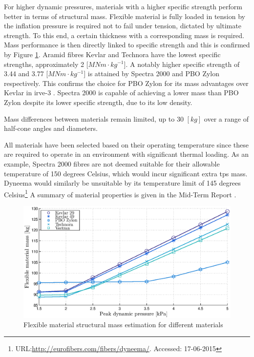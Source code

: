 For higher dynamic pressures, materials with a higher specific strength perform better in terms of structural mass. Flexible material is fully loaded in tension by the inflation pressure is required not to fail under tension, dictated by ultimate strength. To this end, a certain thickness with a corresponding mass is required. Mass performance is then directly linked to specific strength and this is confirmed by Figure \ref{fig:mat}. Aramid fibres Kevlar and Technora have the lowest specific strengths, approximately 2 [$MNm \cdot kg^{-1}$]. A notably higher specific strength of 3.44 and 3.77 [$MNm \cdot kg^{-1}$] is attained by Spectra 2000 and PBO Zylon respectively. This confirms the choice for PBO Zylon for its mass advantages over Kevlar in \gls{irve}-3 \cite{Dillman2012a}. Spectra 2000 is capable of achieving a lower mass than PBO Zylon despite its lower specific strength, due to its low density. 

Mass differences between materials remain limited, up to 30 $[kg]$ over a range of half-cone angles and diameters.

All materials have been selected based on their operating temperature since these are required to operate in an environment with significant thermal loading. As an example, Spectra 2000 fibres are not deemed suitable for their allowable temperature of 150 degrees Celsius, which would incur significant extra \acrfull{tps} mass. Dyneema would similarly be unsuitable by its temperature limit of 145 degrees Celsius\footnote{URL:\url{http://eurofibers.com/fibers/dyneema/}. Accessed: 17-06-2015} A summary of material properties is given in the Mid-Term Report \cite[p.64]{Balasooriyan2015b}. 

\begin{figure}[ht]
	\centering
	\includegraphics[width=1.0\textwidth]{./Figure/Structure/material_test2.eps}
	\caption{Flexible material structural mass estimation for different materials}
	\label{fig:mat}
\end{figure}

